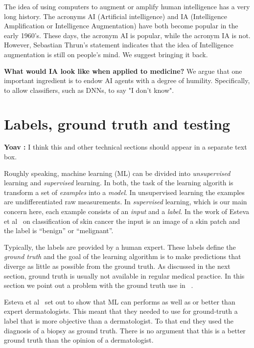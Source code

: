 \documentclass[10pt]{article}
\newcommand{\comment}[3]{{\color{#1} {\bf #2 :} #3}}
\newcommand{\yoav}[1]{\comment{red}{Yoav}{#1}}
\begin{document}
The idea of using computers to augment or amplify human intelligence
has a very long history. The acronyms AI (Artificial intelligence) and
IA (Intelligence Amplification or Intelligence Augmentation) have both
become popular in the early
1960's\cite{ashby1957introduction,engelbart1962augmenting}. These
days, the acronym AI is popular, while the acronym IA is not. However,
Sebastian Thrun's statement indicates that the idea of Intelligence
augmentation is still on people's mind. We suggest bringing it back.

{\bf What would IA look like when applied to medicine?} We argue that
one important ingredient is to endow AI agents with a degree of
humility. Specifically, to allow classifiers, such as DNNs, to say "I
don't know".


\section*{Labels, ground truth and testing}
\yoav{I think this and other technical sections should appear in a
  separate text box.}

Roughly speaking, machine learning (ML) can be divided into {\em unsupervised}
learning and {\em supervised} learning. In both, the task of
the learning algorith is transform a set of {\em examples} into a {\em model}. In
unsupervised learning the examples are undifferentiated raw
measurements. In {\em supervised} learning, which is our main concern
here, each example consists of an {\em input} and a {\em label}. In
the work of Esteva et al~\cite{esteva2017dermatologist} on classification of skin
cancer the input is an image of a skin patch and the label is
``benign'' or ``melignant''.

Typically, the labels are provided by a human expert. These labels
define the {\em ground truth} and the goal of the learning algorithm is
to make predictions that diverge as little as possible from the ground
truth. As discussed in the next section, ground truth is usually not
available in regular medical practice. In this section we point out a
problem with the ground truth use in ~\cite{esteva2017dermatologist}.

Esteva et al~\cite{esteva2017dermatologist} set out to show that ML
can performs as well as or better than expert dermatologists. This
meant that they needed to use for ground-truth a label that is more
objective than a dermatologist. To that end they used the diagnosis of
a biopsy as ground truth. There is no argument that this is a better
ground truth than the opinion of a dermatologist.
\end{document}
